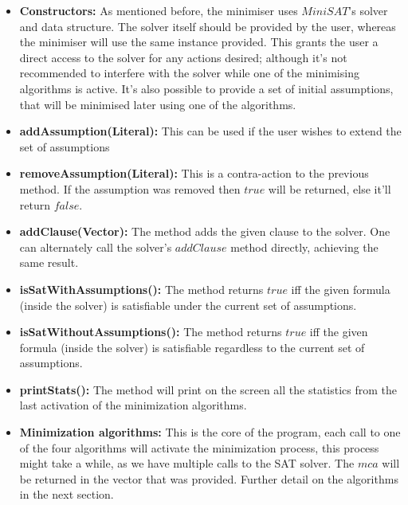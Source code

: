 \documentclass[]{article}
\begin{document}
    \begin{itemize}
    	\item \textbf{Constructors:} As mentioned before, the minimiser uses $MiniSAT$'s solver and data structure. The solver itself should be provided by the user, whereas the minimiser will use the same instance provided. This grants the user a direct access to the solver for any actions desired; although it's not recommended to interfere with the solver while one of the minimising algorithms is active. It's also possible to provide a set of initial assumptions, that will be minimised later using one of the algorithms.    	
    	
    	\item \textbf{addAssumption(Literal):} This can be used if the user wishes to extend the set of assumptions
    	
    	\item \textbf{removeAssumption(Literal):} This is a contra-action to the previous method. If the assumption was removed then $  true $ will be returned, else it'll return $ false $.
    	
    	\item \textbf{addClause(Vector):} The method adds the given clause to the solver. One can alternately call the solver's $ addClause $ method directly, achieving the same result.
    	
    	\item \textbf{isSatWithAssumptions():} The method returns $ true $ iff the given formula (inside the solver) is satisfiable under the current set of assumptions.
    	
    	\item \textbf{isSatWithoutAssumptions():} The method returns $ true $ iff the given formula (inside the solver) is satisfiable regardless to the current set of assumptions.
    	
    	\item \textbf{printStats():} The method will print on the screen all the statistics from the last activation of the minimization algorithms.
    	
    	\item \textbf{Minimization algorithms:} This is the core of the program, each call to one of the four algorithms will activate the minimization process, this process might take a while, as we have multiple calls to the SAT solver. The $ mca $ will be returned in the vector that was provided. Further detail on the algorithms in the next section.
    	
    \end{itemize}
\end{document}
